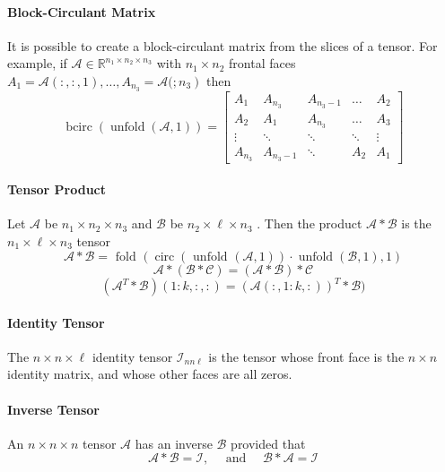 \documentclass[english]{article}
\newcommand{\<}{\langle}
\renewcommand{\>}{\rangle}
\theoremstyle{definition}
\begin{document}
\paragraph{Block-Circulant Matrix} It is possible to create a block-circulant matrix from the slices of a tensor. For example, if  $\mathcal{A} \in \mathbb{R}^{n_{1} \times n_{2} \times n_{3}}$  with  $n_{1} \times n_{2}$  frontal faces  $A_{1}=\mathcal{A}(:,:, 1), \ldots, A_{n_{3}}=\mathcal{A}( 
\left.; n_{3}\right)$  then
\begin{equation*}
\operatorname{bcirc}(\operatorname{unfold}(\mathcal{A}, 1))=\left[\begin{array}{ccccc}
A_{1} & A_{n_{3}} & A_{n_{3}-1} & \dots & A_{2} \\
A_{2} & A_{1} & A_{n_{3}} & \dots & A_{3} \\
\vdots & \ddots & \ddots & \ddots & \vdots \\
A_{n_{3}} & A_{n_{3}-1} & \ddots & A_{2} & A_{1}
\end{array}\right]
\end{equation*}
\paragraph{Tensor Product} Let  $\mathcal{A}$  be  $n_{1} \times n_{2} \times n_{3}$  and  $\mathcal{B}$  be  $n_{2} \times \ell \times n_{3}$ .  Then the product
$\mathcal{A} * \mathcal{B}$  is the  $n_{1} \times \ell \times n_{3}$  tensor
$$\mathcal{A} * \mathcal{B}=\text { fold }(\operatorname{circ}(\text { unfold }(\mathcal{A}, 1)) \cdot \operatorname{unfold}(\mathcal{B}, 1), 1)$$
  $$\mathcal{A} *(\mathcal{B} * \mathcal{C})=(\mathcal{A} * \mathcal{B}) * \mathcal{C}$$
  $$(\mathcal{A}^T *\mathcal{B})(1:k,:,:) = (\mathcal{A}(:,1:k,:))^T * \mathcal{B})$$
\paragraph{Identity Tensor} The  $n \times n \times \ell$  identity tensor  $\mathcal{I}_{n n \ell}$  is the tensor whose front face is the  $n \times n$  identity matrix, and whose other faces are all zeros.
\paragraph{Inverse Tensor} An  $n \times n \times n$  tensor  $\mathcal{A}$  has an inverse  $\mathcal{B}$  provided that
$$\mathcal{A} * \mathcal{B}=\mathcal{I}, \quad \text { and } \quad \mathcal{B} * \mathcal{A}=\mathcal{I}$$
\end{document}
